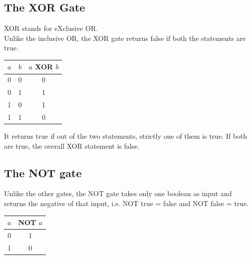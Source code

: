 \documentclass[letterpaper, 12pt]{book}
\begin{document}
\subsection{The XOR Gate}
XOR stands for eXclusive OR.\\
Unlike the inclusive OR, the XOR gate returns false if both the statements are true.\\
\begin{center}
	\begin{tabular}{ |c|c|c| } 
		\hline
		$a$ & $b$ & $a$ XOR $b$ \\ 
		\hline
		0 & 0 & 0 \\ 
		0 & 1 & 1 \\
		1 & 0 & 1 \\
		1 & 1 & 0 \\
		\hline
	\end{tabular}
\end{center}
It returns true if out of the two statements, strictly one of them is true. If both are true, the overall XOR statement is false.
\subsection{The NOT gate}
Unlike the other gates, the NOT gate takes only one boolean as input and returns the negative of that input, i.e. NOT true = false and NOT false = true.
\begin{center}
	\begin{tabular}{ |c|c| } 
		\hline
		$a$ & NOT $a$ \\ 
		\hline 
		0 & 1 \\
		1 & 0 \\
		\hline
	\end{tabular}
\end{center}
\end{document}
